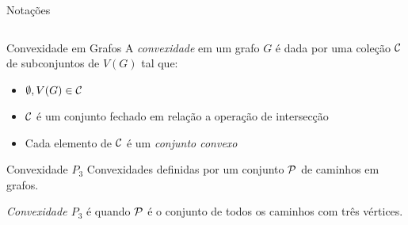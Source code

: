 \begin{frame}{Notações}
\begin{columns}[T]
\begin{column}{.3\textwidth}
            \end{column}
      \end{columns}

\end{frame}


\begin{frame}{Convexidade em Grafos}
      A \textit{convexidade} em um grafo $G$ é dada por uma coleção ${\cal C}$ de subconjuntos de $V(G)$ tal que:
      \begin{itemize}
            \item$\emptyset,V(G) \in {\cal C}$
            \item ${\cal C}$ é um conjunto fechado em relação a operação de intersecção
            \item Cada elemento de ${\cal C}$ é um \textit{conjunto convexo}
      \end{itemize}
\end{frame}

\begin{frame}{Convexidade $P_3$}
      Convexidades definidas por um conjunto ${\cal P}$ de caminhos em grafos.
      
      \vspace{0.5cm}
      \textit{Convexidade $P_3$} é quando ${\cal P}$ é o conjunto de todos os caminhos com três vértices.

\end{frame}

